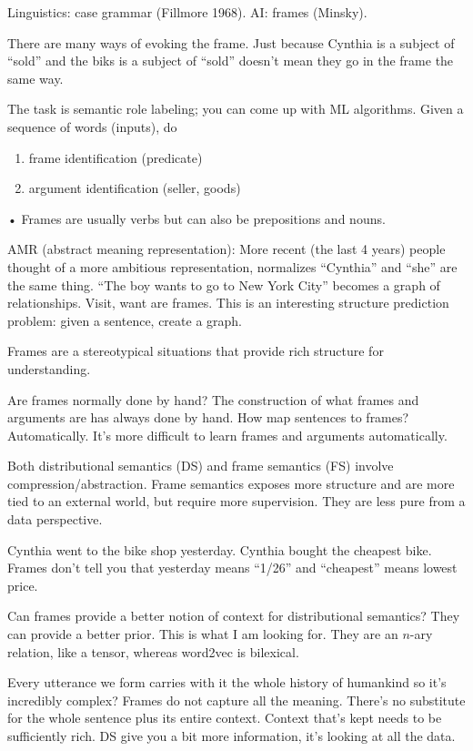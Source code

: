 Linguistics: case grammar (Fillmore 1968). AI: frames (Minsky).

There are many ways of evoking the frame. Just because Cynthia is a subject of ``sold'' and the biks is a subject of ``sold'' doesn't mean they go in the frame the same way.

The task is semantic role labeling; you can come up with ML algorithms.
Given a sequence of words (inputs), do
\begin{enumerate}
\item
frame identification (predicate)
\item
argument identification (seller, goods)
\end{enumerate}•
Frames are usually verbs but can also be prepositions and nouns.

AMR (abstract meaning representation): More recent (the last 4 years) people thought of a more ambitious representation, normalizes ``Cynthia'' and ``she'' are the same thing. ``The boy wants to go to New York City'' becomes a graph of relationships. Visit, want are frames. This is an interesting structure prediction problem: given a sentence, create a graph. 

Frames are a stereotypical situations that provide rich structure for understanding. %


Are frames normally done by hand? The construction of what frames and arguments are has always done by hand. How map sentences to frames? Automatically. It's more difficult to learn frames and arguments automatically.


Both distributional semantics (DS) and frame semantics (FS) involve compression/abstraction. Frame semantics exposes more structure and are more tied to an external world, but require more supervision. They are less pure from a data perspective.

Cynthia went to the bike shop yesterday. Cynthia bought the cheapest bike. 
Frames don't tell you that yesterday means ``1/26'' and ``cheapest'' means lowest price.

Can frames provide a better notion of context for distributional semantics? They can provide a better prior. This is what I am looking for. They are an $n$-ary relation, like a tensor, whereas word2vec is bilexical.

Every utterance we form carries with it the whole history of humankind so it's incredibly complex? Frames do not capture all the meaning. There's no substitute for the whole sentence plus its entire context. Context that's kept needs to be sufficiently rich. DS give you a bit more information, it's looking at all the data.

